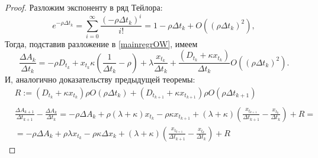 \begin{proof}
    Разложим экспоненту в ряд Тейлора:
    \begin{equation*}
        e^{- \rho \Delta t_k} = \sum_{i=0}^{\infty} \frac{(-\rho \Delta t_k)^i}{i!} = 1 - \rho \Delta t_k + O((\rho \Delta t_k)^2),
    \end{equation*}
    Тогда, подставив разложение в \eqref{mainregrOW}, имеем
    \begin{equation*}
        \frac{\Delta A_k}{\Delta t_k} = - \rho D_{t_k}
        + x_{t_k}  \kappa (\frac{1}{\Delta t_k} -  \rho) + \lambda  \frac{x_{t_k}}{\Delta t_k}
        + \frac{(D_{t_k} + \kappa x_{t_k})}{\Delta t_k} O((\rho \Delta t_k)^2).
    \end{equation*}
    И, аналогично доказательству предыдущей теоремы:
    \begin{align*}
         & R := (D_{t_k} + \kappa x_{t_k}) \rho O(\rho \Delta t_k) + (D_{t_{k+1}} + \kappa x_{t_{k+1}}) \rho O(\rho \Delta t_{k+1})     \\                            \\
         & \frac{\Delta A_{k+1}}{\Delta t_{k+1}} - \frac{\Delta A_{k}}{\Delta t_{k}} = -\rho \Delta A_k + \rho (\lambda + \kappa) x_{t_k} 
         - \rho \kappa x_{t_{k+1}}
        + (\lambda + \kappa) \left(\frac{x_{t_{k+1}}}{\Delta t_{k+1}} - \frac{x_{t_k}}{\Delta t_{k}}\right) + R = \\
        & = -\rho \Delta A_k + \rho \lambda x_{t_k} - \rho \kappa \Delta x_{k}
       + (\lambda + \kappa) \left(\frac{x_{t_{k+1}}}{\Delta t_{k+1}} - \frac{x_{t_k}}{\Delta t_{k}}\right) + R
    \end{align*}
\end{proof}